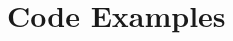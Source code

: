 \chapter{Code Examples}
\begin{comment}
For some projects, it might be relevant to include some code extracts in an appendix. You are not expected to put all of your code here - the correct place for all of your code is in the technical submission that is made in addition to the Project Report. However, if there are some notable aspects of the code that you discuss, including that in an appendix might be useful to make it easier for your readers to access. 

As a general guide, if you are discussing short extracts of code then you are advised to include such code in the body of the report. If there is a longer extract that is relevant, then you might include it as shown in the following section. 

Only include code in the appendix if that code is discussed and referred to in the body of the report. 

\section{Random Number Generator}

The Bayes Durham Shuffle ensures that the psuedo random numbers used in the simulation are further shuffled, ensuring minimal correlation between subsequent random outputs \cite{NumericalRecipes}.

\begin{verbatim}
 #define IM1 2147483563
 #define IM2 2147483399
 #define AM (1.0/IM1)
 #define IMM1 (IM1-1)
 #define IA1 40014
 #define IA2 40692 
 #define IQ1 53668
 #define IQ2 52774
 #define IR1 12211
 #define IR2 3791
 #define NTAB 32
 #define NDIV (1+IMM1/NTAB)
 #define EPS 1.2e-7
 #define RNMX (1.0 - EPS)
 
 double ran2(long *idum)
 {
   /*---------------------------------------------------*/
   /* Minimum Standard Random Number Generator          */
   /* Taken from Numerical recipies in C                */
   /* Based on Park and Miller with Bays Durham Shuffle */
   /* Coupled Schrage methods for extra periodicity     */
   /* Always call with negative number to initialise    */
   /*---------------------------------------------------*/	
 
   int j;
   long k;
   static long idum2=123456789;
   static long iy=0;
   static long iv[NTAB];
   double temp;
 

\end{comment}
